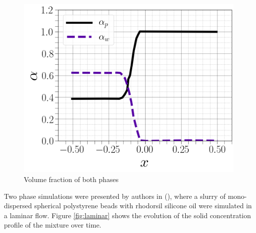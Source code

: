\documentclass[review,3p,times,12pt]{elsarticle}
\begin{document}
\begin{minipage}{0.4\textwidth}
\begin{figure}[H]
   \begin{center}
    \includegraphics[trim=0cm 0cm 0cm 0cm,clip,scale=0.25]{5.png}
    \caption{ \footnotesize { Volume fraction of both phases }}
    \label{fig:gauss}
       \end{center}
\end{figure} 
\end{minipage}
\begin{center}
\end{center}
Two phase simulations were presented by authors in (\citet{elkarii2020towards}), where a slurry of mono-dispersed spherical polystyrene beads with rhodorsil silicone oil were simulated in a laminar flow. Figure \ref{fig:laminar} shows the evolution of the solid concentration profile of the mixture over time.\\
\end{document}
